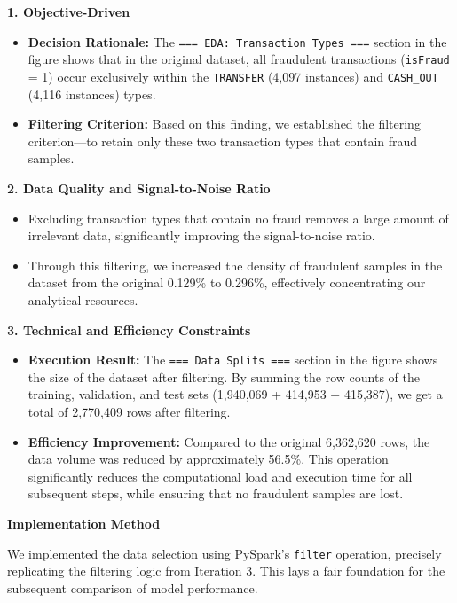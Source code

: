 \documentclass[sigplan,screen]{acmart}
\begin{document}
\textbf{1. Objective-Driven}

\begin{itemize}
\item \textbf{Decision Rationale:} The \texttt{=== EDA: Transaction Types ===} section in the figure shows that in the original dataset, all fraudulent transactions (\texttt{isFraud} = 1) occur exclusively within the \texttt{TRANSFER} (4,097 instances) and \texttt{CASH\_OUT} (4,116 instances) types.
\item \textbf{Filtering Criterion:} Based on this finding, we established the filtering criterion---to retain only these two transaction types that contain fraud samples.
\end{itemize}

\textbf{2. Data Quality and Signal-to-Noise Ratio}

\begin{itemize}
\item Excluding transaction types that contain no fraud removes a large amount of irrelevant data, significantly improving the signal-to-noise ratio.
\item Through this filtering, we increased the density of fraudulent samples in the dataset from the original 0.129\% to 0.296\%, effectively concentrating our analytical resources.
\end{itemize}

\textbf{3. Technical and Efficiency Constraints}

\begin{itemize}
\item \textbf{Execution Result:} The \texttt{=== Data Splits ===} section in the figure shows the size of the dataset after filtering. By summing the row counts of the training, validation, and test sets (1,940,069 + 414,953 + 415,387), we get a total of 2,770,409 rows after filtering.
\item \textbf{Efficiency Improvement:} Compared to the original 6,362,620 rows, the data volume was reduced by approximately 56.5\%. This operation significantly reduces the computational load and execution time for all subsequent steps, while ensuring that no fraudulent samples are lost.
\end{itemize}

\textbf{Implementation Method}

We implemented the data selection using PySpark's \texttt{filter} operation, precisely replicating the filtering logic from Iteration 3. This lays a fair foundation for the subsequent comparison of model performance.
\end{document}
